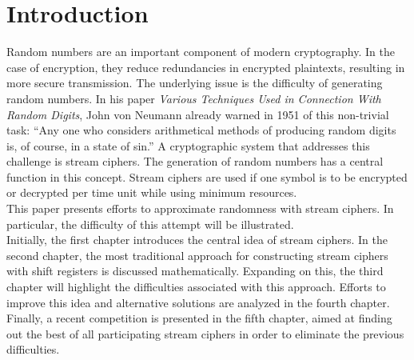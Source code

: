 \section{Introduction}

Random numbers are an important component of modern cryptography. In the case of encryption, they reduce redundancies in encrypted plaintexts, resulting in more secure transmission. \cite[p. 107]{Zhang.2014} The underlying issue is the difficulty of generating random numbers. In his paper \textit{Various Techniques Used in Connection With Random Digits}, John von Neumann already warned in 1951 of this non-trivial task: “Any one who considers arithmetical methods of producing random digits is, of course, in a state of sin.” \cite[p. 36]{vonNeumann1951} A cryptographic system that addresses this challenge is stream ciphers. The generation of random numbers has a central function in this concept. Stream ciphers are used if one symbol is to be encrypted or decrypted per time unit while using minimum resources. \cite[p. 191]{Menezes.2001} \\

This paper presents efforts to approximate randomness with stream ciphers. In particular, the difficulty of this attempt will be illustrated.\\

Initially, the first chapter introduces the central idea of stream ciphers. In the second chapter, the most traditional approach for constructing stream ciphers with shift registers is discussed mathematically. Expanding on this, the third chapter will highlight the difficulties associated with this approach. Efforts to improve this idea and alternative solutions are analyzed in the fourth chapter. Finally, a recent competition is presented in the fifth chapter, aimed at finding out the best of all participating stream ciphers in order to eliminate the previous difficulties.

\pagebreak
